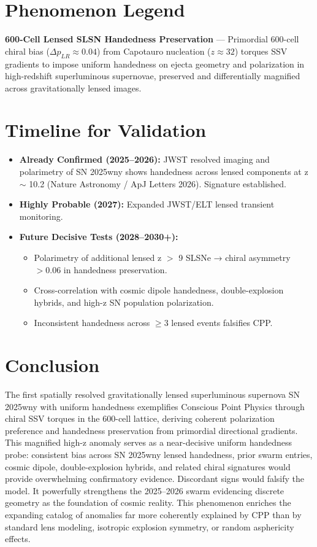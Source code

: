 \documentclass[11pt]{article}
\begin{document}
\section{Phenomenon Legend}
\textbf{600-Cell Lensed SLSN Handedness Preservation} — Primordial 600-cell chiral bias ($\Delta p_{LR} \approx 0.04$) from Capotauro nucleation ($z \approx 32$) torques SSV gradients to impose uniform handedness on ejecta geometry and polarization in high-redshift superluminous supernovae, preserved and differentially magnified across gravitationally lensed images.

\section{Timeline for Validation}
\begin{itemize}
    \item \textbf{Already Confirmed (2025--2026):} JWST resolved imaging and polarimetry of SN 2025wny shows handedness across lensed components at z $\sim$ 10.2 (Nature Astronomy / ApJ Letters 2026). Signature established.
    \item \textbf{Highly Probable (2027):} Expanded JWST/ELT lensed transient monitoring.
    \item \textbf{Future Decisive Tests (2028--2030+):}
    \begin{itemize}
        \item Polarimetry of additional lensed z $>$ 9 SLSNe → chiral asymmetry $>0.06$ in handedness preservation.
        \item Cross-correlation with cosmic dipole handedness, double-explosion hybrids, and high-z SN population polarization.
        \item Inconsistent handedness across $\geq 3$ lensed events falsifies CPP.
    \end{itemize}
\end{itemize}

\section{Conclusion}
The first spatially resolved gravitationally lensed superluminous supernova SN 2025wny with uniform handedness exemplifies Conscious Point Physics through chiral SSV torques in the 600-cell lattice, deriving coherent polarization preference and handedness preservation from primordial directional gradients.  
This magnified high-z anomaly serves as a near-decisive uniform handedness probe: consistent bias across SN 2025wny lensed handedness, prior swarm entries, cosmic dipole, double-explosion hybrids, and related chiral signatures would provide overwhelming confirmatory evidence. Discordant signs would falsify the model. It powerfully strengthens the 2025--2026 swarm evidencing discrete geometry as the foundation of cosmic reality.  
This phenomenon enriches the expanding catalog of anomalies far more coherently explained by CPP than by standard lens modeling, isotropic explosion symmetry, or random asphericity effects.
\end{document}

